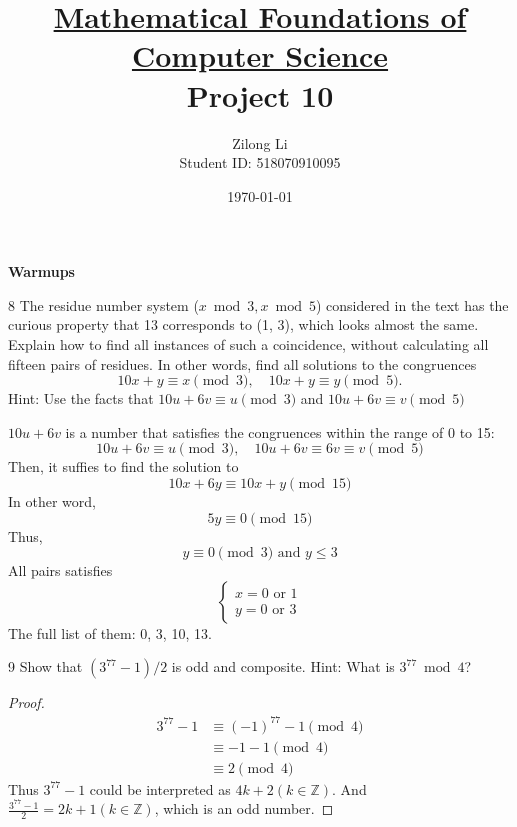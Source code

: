 \documentclass[a4paper,12pt]{article}
\title{\small \underline{Mathematical Foundations of Computer Science}\\\Large Project 10}
\author{Zilong Li\\\small Student ID: 518070910095}
\date{\today}
\makeatletter
\newtheorem*{solution}{Solution}
\theoremstyle{definition}
\renewenvironment{solution}[1][Solution] {\par\pushQED{\qed}\normalfont\topsep6\p@\@plus6\p@\relax\trivlist\item[\hskip\labelsep\bfseries#1\@addpunct{.}]\ignorespaces}{\popQED\endtrivlist\@endpefalse} \makeatother
\newenvironment{problems}{\begin{list}{}{\renewcommand{\makelabel}[1]{\textbf{##1}\hfil}}}{\end{list}}
\makeatother
\begin{document}
\maketitle

\noindent\textbf{Warmups}

\begin{problems}
    \item[8]The residue number system  ($x\bmod 3, x \bmod 5$) considered in the text has the curious property that 13 corresponds to (1, 3), which looks almost the same.  Explain how to find all instances of such a coincidence, without calculating all fifteen pairs of residues.  In other words, find all solutions to the congruences
    \begin{equation*}
        10x+y\equiv x\pmod 3,\quad 10x+y \equiv y\pmod 5.    
    \end{equation*}
    Hint: Use the facts that $10u+6v\equiv u\pmod 3$ and $10u+6v\equiv v\pmod 5$
    \begin{solution}
        $10u+6v$ is a number that satisfies the congruences within the range of 0 to 15:
        \begin{equation*}
            10u+6v\equiv u \pmod 3, \quad 10u+6v\equiv 6v \equiv v \pmod 5
        \end{equation*}
        Then, it suffies to find the solution to
        \begin{equation*}
            10x+6y\equiv 10x+y \pmod{15}
        \end{equation*}
        In other word,
        \begin{equation*}
            5y\equiv 0 \pmod{15}
        \end{equation*}
        Thus,
        \begin{equation*}
            y\equiv 0\pmod{3} \text{ and } y\leq 3
        \end{equation*}
        All pairs satisfies
        \begin{equation*}
            \begin{cases}
                x=0\text{ or }1\\
                y=0\text{ or }3
            \end{cases}
        \end{equation*}
        The full list of them: 0, 3, 10, 13.
    \end{solution}

    \item[9] Show that $(3^{77}-1)/2$ is odd and composite. Hint: What is $3^{77}\bmod 4$?
    \begin{proof}
        \begin{align*}
            3^{77} - 1&\equiv (-1)^{77} - 1 \pmod 4\\
                &\equiv -1 - 1\pmod 4\\
                &\equiv 2 \pmod 4
        \end{align*}
        Thus $3^{77}-1$ could be interpreted as $4k+2(k\in\mathbb{Z})$. And $\frac{3^{77}-1}{2}=2k+1(k\in\mathbb{Z})$, which is an odd number.


\end{proof}
\end{problems}
\end{document}
